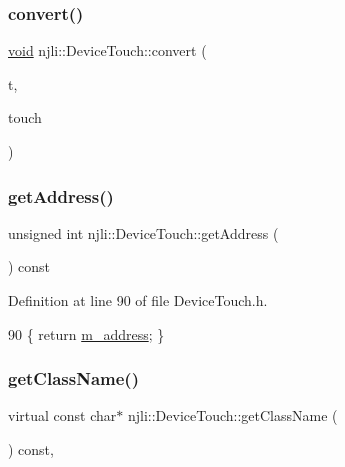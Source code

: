 \subsubsection{\texorpdfstring{convert()}{convert()}}
{\footnotesize\ttfamily \mbox{\hyperlink{_thread_8h_af1e856da2e658414cb2456cb6f7ebc66}{void}} njli\+::\+Device\+Touch\+::convert (\begin{DoxyParamCaption}\item[{\mbox{\hyperlink{classnjli_1_1_device_touch}{Device\+Touch}} \&}]{t,  }\item[{const \mbox{\hyperlink{_thread_8h_af1e856da2e658414cb2456cb6f7ebc66}{void}} $\ast$}]{touch }\end{DoxyParamCaption})\hspace{0.3cm}{\ttfamily [private]}}

\mbox{\label{classnjli_1_1_device_touch_a28c015bf3cf07e3c9925b52cb457cd0a}} 
\subsubsection{\texorpdfstring{get\+Address()}{getAddress()}}
{\footnotesize\ttfamily unsigned int njli\+::\+Device\+Touch\+::get\+Address (\begin{DoxyParamCaption}{ }\end{DoxyParamCaption}) const\hspace{0.3cm}{\ttfamily [inline]}}



Definition at line 90 of file Device\+Touch.\+h.


\begin{DoxyCode}
90 \{ \textcolor{keywordflow}{return} \mbox{\hyperlink{classnjli_1_1_device_touch_adf8b9a7a96b90d0639aca0b9982a95d7}{m\_address}}; \}
\end{DoxyCode}
\mbox{\label{classnjli_1_1_device_touch_a0bf7b53fef161666e8c70bf2482be1c8}} 
\subsubsection{\texorpdfstring{get\+Class\+Name()}{getClassName()}}
{\footnotesize\ttfamily virtual const char$\ast$ njli\+::\+Device\+Touch\+::get\+Class\+Name (\begin{DoxyParamCaption}{ }\end{DoxyParamCaption}) const\hspace{0.3cm}{\ttfamily [inline]}, {\ttfamily [virtual]}}



